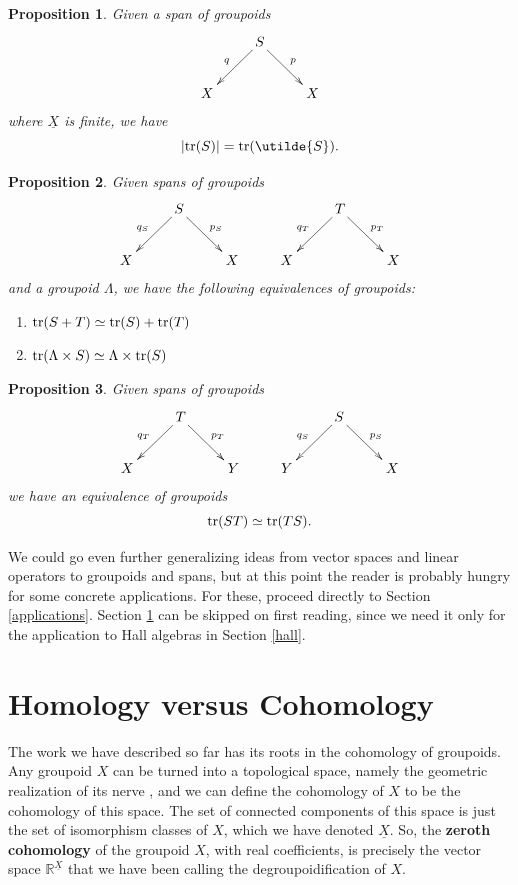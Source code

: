\documentclass{article}
\newcommand{\tr}{{\rm tr}}
\newcommand{\R}{{\mathbb R}}
\renewcommand{\u}[1]{\underline{#1}}
\newtheorem*{proposition*}{Proposition}
\begin{document}
\begin{proposition*}
Given a span of groupoids
\[
\xymatrix{
& S \ar[dl]_q \ar[dr]^p & \\
X & & X  
}
\]
where $\u{X}$ is finite, we have
\[           |\tr(S)| = \tr({\utilde{S}}) .\]
\end{proposition*}

\begin{proposition*}
Given spans of groupoids
\[
\xymatrix{
& S \ar[dl]_{q_S} \ar[dr]^{p_S} & & & T \ar[dl]_{q_T} \ar[dr]^{p_T} & \\
X & & X & X & & X
}
\]
and a groupoid $\Lambda$, we have the following equivalences of 
groupoids:
\begin{enumerate}
\item $\tr(S + T) \simeq \tr(S) + \tr(T)$  
\item $\tr(\Lambda \times S) \simeq \Lambda \times \tr(S)$ 
\end{enumerate}
\end{proposition*}

\begin{proposition*}
Given spans of groupoids 
\[
\xymatrix{
& T \ar[dl]_{q_T} \ar[dr]^{p_T} & & & S \ar[dl]_{q_S} \ar[dr]^{p_S} & \\
X & & Y & Y & & X
}
\]
we have an equivalence of groupoids
\[           \tr(ST) \simeq \tr(TS) .\]
\end{proposition*}

We could go even further generalizing ideas from vector spaces and
linear operators to groupoids and spans, but at this point the reader
is probably hungry for some concrete applications.  For these, proceed
directly to Section \ref{applications}.  Section \ref{homology} can be
skipped on first reading, since we need it only for the application to
Hall algebras in Section \ref{hall}.

\section{Homology versus Cohomology} \label{homology}

The work we have described so far has its roots in the cohomology of
groupoids.  Any groupoid $X$ can be turned into a topological space,
namely the geometric realization of its nerve \cite{GJ}, and we can
define the cohomology of $X$ to be the cohomology of this space.  The
set of connected components of this space is just the set of
isomorphism classes of $X$, which we have denoted $\u{X}$.
So, the {\bf zeroth cohomology} of the groupoid $X$, with real
coefficients, is precisely the vector space $\R^{\u{X}}$ that
we have been calling the degroupoidification of $X$.
\end{document}
